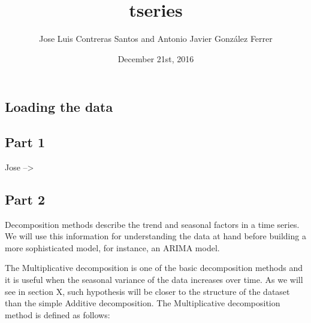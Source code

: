 \documentclass[]{article}
\title{tseries}
\author{Jose Luis Contreras Santos and Antonio Javier González Ferrer}
\date{December 21st, 2016}
\newenvironment{Shaded}{\begin{snugshade}}{\end{snugshade}}
\newcommand{\KeywordTok}[1]{\textcolor[rgb]{0.13,0.29,0.53}{\textbf{{#1}}}}
\newcommand{\DataTypeTok}[1]{\textcolor[rgb]{0.13,0.29,0.53}{{#1}}}
\newcommand{\DecValTok}[1]{\textcolor[rgb]{0.00,0.00,0.81}{{#1}}}
\newcommand{\StringTok}[1]{\textcolor[rgb]{0.31,0.60,0.02}{{#1}}}
\newcommand{\CommentTok}[1]{\textcolor[rgb]{0.56,0.35,0.01}{\textit{{#1}}}}
\newcommand{\OtherTok}[1]{\textcolor[rgb]{0.56,0.35,0.01}{{#1}}}
\newcommand{\NormalTok}[1]{{#1}}
\begin{document}
\maketitle

\subsection{Loading the data}\label{loading-the-data}

\begin{Shaded}
\end{Shaded}

\subsection{Part 1}\label{part-1}

Jose --\textgreater{}

\subsection{Part 2}\label{part-2}

Decomposition methods describe the trend and seasonal factors in a time
series. We will use this information for understanding the data at hand
before building a more sophisticated model, for instance, an ARIMA
model.

The Multiplicative decomposition is one of the basic decomposition
methods and it is useful when the seasonal variance of the data
increases over time. As we will see in section X, such hypothesis will
be closer to the structure of the dataset than the simple Additive
decomposition. The Multiplicative decomposition method is defined as
follows:
\end{document}
